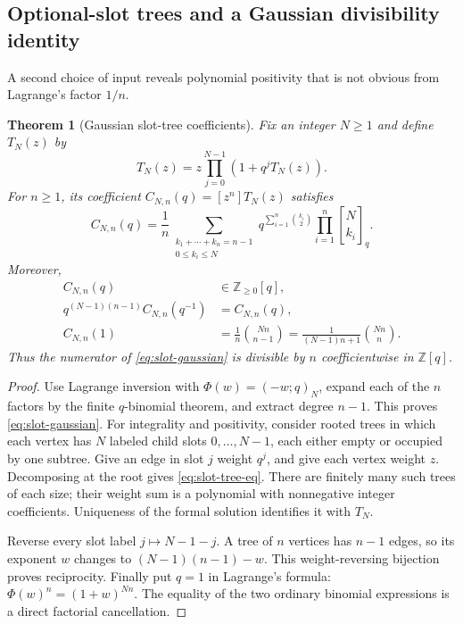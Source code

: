 \documentclass[11pt,a4paper]{article}
\numberwithin{equation}{section}
\newtheorem{theorem}{Theorem}[section]
\theoremstyle{definition}
\theoremstyle{remark}
\newcommand{\Z}{\mathbb Z}
\newcommand{\G}[2]{\genfrac{[}{]}{0pt}{}{#1}{#2}_{q}}
\newcommand{\coef}[2]{[#1^{#2}]}
\begin{document}
\subsection{Optional-slot trees and a Gaussian divisibility identity}
A second choice of input reveals polynomial positivity that is not
obvious from Lagrange's factor $1/n$.

\begin{theorem}[Gaussian slot-tree coefficients]
Fix an integer $N\ge1$ and define $T_N(z)$ by
\begin{equation}
 T_N(z)=z\prod_{j=0}^{N-1}(1+q^jT_N(z)).
 \label{eq:slot-tree-eq}
\end{equation}
For $n\ge1$, its coefficient $C_{N,n}(q)=\coef zn T_N(z)$ satisfies
\begin{equation}
 C_{N,n}(q)=\frac1n
   \sum_{\substack{k_1+\cdots+k_n=n-1\\0\le k_i\le N}}
        q^{\sum_{i=1}^n\binom{k_i}2}
        \prod_{i=1}^n\G N{k_i}.
 \label{eq:slot-gaussian}
\end{equation}
Moreover,
\begin{align}
 C_{N,n}(q)&\in\Z_{\ge0}[q],
 \label{eq:slot-positive}\\
 q^{(N-1)(n-1)}C_{N,n}(q^{-1})&=C_{N,n}(q),
 \label{eq:slot-reciprocal}\\
 C_{N,n}(1)&=\frac1n\binom{Nn}{n-1}
 =\frac1{(N-1)n+1}\binom{Nn}{n}.
 \label{eq:slot-fuss}
\end{align}
Thus the numerator of \cref{eq:slot-gaussian} is divisible by $n$
coefficientwise in $\Z[q]$.
\end{theorem}
\begin{proof}
Use Lagrange inversion with $\Phi(w)=(-w;q)_N$, expand each of the $n$
factors by the finite $q$-binomial theorem, and extract degree $n-1$.
This proves \cref{eq:slot-gaussian}.
For integrality and positivity, consider rooted trees in which each
vertex has $N$ labeled child slots $0,\ldots,N-1$, each either empty or
occupied by one subtree. Give an edge in slot $j$ weight $q^j$, and give
each vertex weight $z$. Decomposing at the root gives
\cref{eq:slot-tree-eq}. There are finitely many such trees of each size;
their weight sum is a polynomial with nonnegative integer coefficients.
Uniqueness of the formal solution identifies it with $T_N$.

Reverse every slot label $j\mapsto N-1-j$. A tree of $n$ vertices has
$n-1$ edges, so its exponent $w$ changes to $(N-1)(n-1)-w$. This
weight-reversing bijection proves reciprocity. Finally put $q=1$ in
Lagrange's formula: $\Phi(w)^n=(1+w)^{Nn}$. The equality of the two
ordinary binomial expressions is a direct factorial cancellation.
\end{proof}
\end{document}
